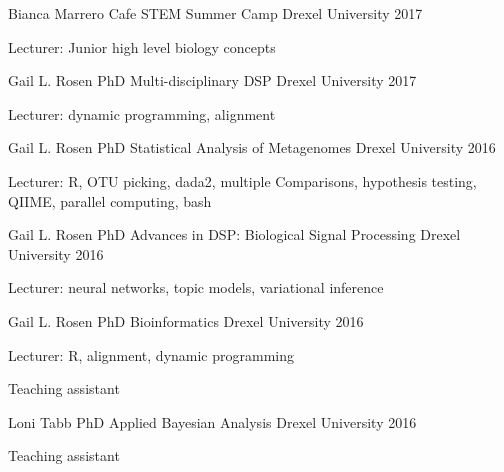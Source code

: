 



\begin{cventries}

\cventry
    {Bianca Marrero}
    {Cafe STEM Summer Camp}
    {Drexel University}
    {2017}
    {\begin{cvitems}
        \item Lecturer: Junior high level biology concepts
    \end{cvitems}}
    
\cventry
    {Gail L. Rosen PhD}
    {Multi-disciplinary DSP}
    {Drexel University}
    {2017}
    {\begin{cvitems}
        \item Lecturer: dynamic programming, alignment
    \end{cvitems}}
    
\cventry
    {Gail L. Rosen PhD}
    {Statistical Analysis of Metagenomes}
    {Drexel University}
    {2016}
    {\begin{cvitems}
        \item Lecturer: R, OTU picking, dada2, multiple Comparisons, hypothesis testing, QIIME, parallel computing, bash
    \end{cvitems}}
\cventry
    {Gail L. Rosen PhD}
    {Advances in DSP: Biological Signal Processing}
    {Drexel University}
    {2016}
    {\begin{cvitems}
        \item Lecturer: neural networks, topic models, variational inference
    \end{cvitems}}
    
\cventry
    {Gail L. Rosen PhD}
    {Bioinformatics}
    {Drexel University}
    {2016}
    {\begin{cvitems}
        \item Lecturer: R, alignment, dynamic programming
        \item Teaching assistant
    \end{cvitems}}
    
\cventry
    {Loni Tabb PhD}
    {Applied Bayesian Analysis}
    {Drexel University}
    {2016}
    {\begin{cvitems}
        \item Teaching assistant
    \end{cvitems}}
    

\end{cventries}
